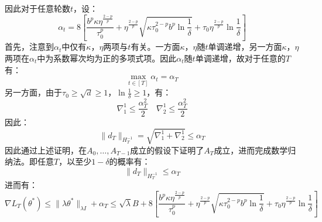 \documentclass[UTF8,a4paper,10.5pt]{ctexart}
\begin{document}
因此对于任意轮数$t$，设：
\begin{equation}
	\alpha_t = 8\left[\frac{b^p\kappa \eta^{\frac{2-p}{p}}}{\tau_0^{p}} + \eta^{\frac{2-p}{p}}\sqrt{\kappa \tau_0^{2-p} b^p \ln\frac{1}{\delta}}+ \tau_0 \eta^{\frac{2-p}{p}}\ln\frac{1}{\delta}\right]
	\label{alphaT}
\end{equation}
首先，注意到$\alpha_t$中仅有$\kappa$，$\eta$两项与$t$有关。一方面$\kappa$，$\eta$随$t$单调递增，另一方面$\kappa$，$\eta$两项在$\alpha_t$中为系数幂次均为正的多项式项。因此$\alpha_t$随$t$单调递增，故对于任意的$T$有：
\begin{equation}
	\max_{t\in [T]}\alpha_t = \alpha_T
\end{equation}
另一方面，由于$\tau_0 \geq \sqrt{d}\geq 1$，$\ln\frac{1}{\delta}\geq 1$，有：
\begin{equation*}
	\nabla_1^1 \leq \frac{\alpha_T^2}{2} \quad \nabla_2^1 \leq \frac{\alpha_T^2}{2}
\end{equation*}
因此：
\begin{equation*}
	\|d_T\|_{H_T^{-1}}= \sqrt{\nabla_1^1 + \nabla_2^1}\leq \alpha_T
\end{equation*}
因此通过上述证明，在$A_0,\ldots,A_{T-1}$成立的假设下证明了$A_T$成立，进而完成数学归纳法。即任意$T$，以至少$1-\delta$的概率有：
\begin{equation}
	\|d_T\|_{H_T^{-1}}\leq \alpha_T
\end{equation}
进而有：
\begin{equation}
	\nabla L_T(\theta^*)\leq \|\lambda \theta^*\|_{\lambda I} + \alpha_T \leq \sqrt{\lambda}B + 8\left[\frac{b^p\kappa \eta^{\frac{2-p}{p}}}{\tau_0^{p}} + \eta^{\frac{2-p}{p}}\sqrt{\kappa \tau_0^{2-p} b^p \ln\frac{1}{\delta}}+ \tau_0 \eta^{\frac{2-p}{p}}\ln\frac{1}{\delta}\right]
\end{equation}
\end{document}
